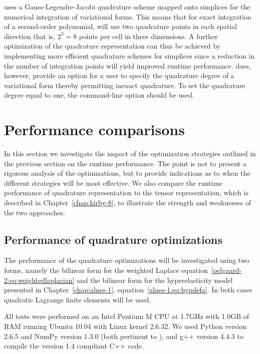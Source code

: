 \ffc{} uses a Gauss-Legendre-Jacobi quadrature scheme mapped onto
simplices for the numerical integration of variational forms.  This means
that for exact integration of a second-order polynomial, \ffc{} will
use two quadrature points in each spatial direction that is, $2^3 =
8$ points per cell in three dimensions.  A further optimization of
the quadrature representation can thus be achieved by implementing more
efficient quadrature schemes for simplices since a reduction in the number
of integration points will yield improved runtime performance.  \ffc{}
does, however, provide an option for a user to specify the quadrature
degree of a variational form thereby permitting inexact quadrature.
To set the quadrature degree equal to one, the command-line option
 should be used.
\section{Performance comparisons}

In this section we investigate the impact of the optimization strategies
outlined in the previous section on the runtime performance. The
point is not to present a rigorous analysis of the optimizations,
but to provide indications as to when the different strategies will be
most effective.  We also compare the runtime performance of quadrature
representation to the tensor representation, which is described in
Chapter~\ref{chap:kirby-8}, to illustrate the strength and weaknesses
of the two approaches.
\subsection{Performance of quadrature optimizations}
\label{oelgaard-2:sec:quad_performance}

The performance of the quadrature optimizations will be investigated
using two forms, namely the bilinear form for the weighted Laplace
equation~\eqref{oelgaard-2:eq:weightedlaplacian} and the bilinear form
for the hyperelasticity model presented in Chapter~\ref{chap:alnes-1},
equation~\eqref{alnes-1:eq:hypdefa}.  In both cases quadratic Lagrange
finite elements will be used.

All tests were performed on an Intel Pentium M CPU at 1.7GHz with 1.0GB
of RAM running Ubuntu 10.04 with Linux kernel 2.6.32.  We used Python
version 2.6.5 and NumPy version 1.3.0 (both pertinent to \ffc{}), and g++
version 4.4.3 to compile the \ufc{} version 1.4 compliant C++ code.

